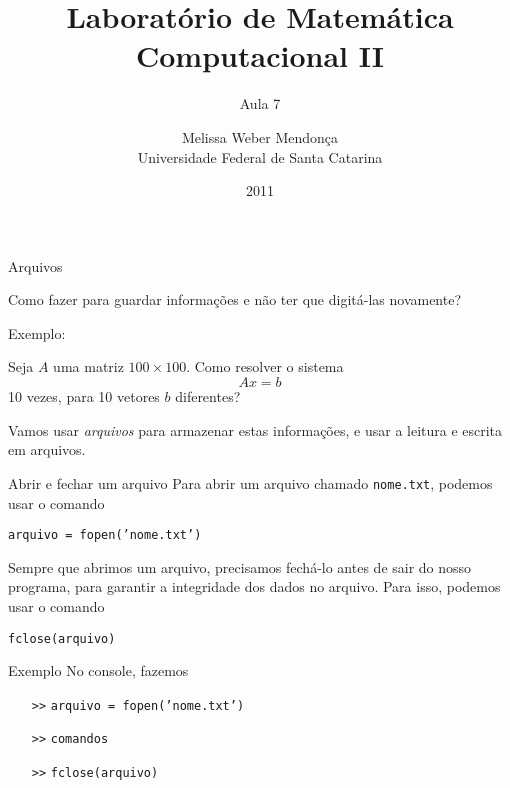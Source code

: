 \documentclass[hyperref={pdfpagelabels=false}]{beamer}
\title{Laboratório de Matemática Computacional II}
\subtitle{Aula 7}
\author[M. Weber Mendonça]{Melissa Weber Mendonça\\
Universidade Federal de Santa Catarina}
\date{2011}
\begin{document}
\setmonofont{Inconsolata}

\begin{frame}
  \titlepage
\end{frame}

\begin{frame}{Arquivos}
  
  Como fazer para guardar informações e não ter que digitá-las novamente?
  \vfill
  
  Exemplo:

  Seja $A$ uma matriz $100\times 100$. Como resolver o sistema
  \begin{equation*}
    Ax=b
  \end{equation*}
  10 vezes, para 10 vetores $b$ diferentes?
  \vfill

  Vamos usar \emph{\alert{arquivos}} para armazenar estas informações, e usar a leitura e escrita em arquivos.
\end{frame}

\begin{frame}{Abrir e fechar um arquivo}
  Para abrir um arquivo chamado \texttt{nome.txt}, podemos usar o comando
  \begin{center}
    \texttt{arquivo = fopen('nome.txt')}
  \end{center}
  \vfill
  Sempre que abrimos um arquivo, precisamos fechá-lo antes de sair do nosso programa, para garantir a integridade dos dados no arquivo. Para isso, podemos usar o comando
  \begin{center}
    \texttt{fclose(arquivo)}
  \end{center}
\end{frame}

\begin{frame}{Exemplo}
  No console, fazemos
  \vfill
  \begin{itemize}
  \item[\texttt{>>}] \texttt{arquivo = fopen('nome.txt')}
  \item[\texttt{>>}] \texttt{\alert{comandos}}
  \item[\texttt{>>}] \texttt{fclose(arquivo)}
  \end{itemize}
\end{frame}
\end{document}
